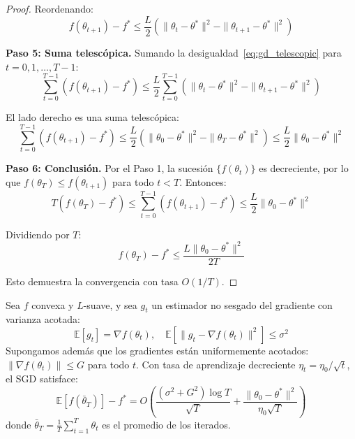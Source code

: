 \begin{proof}
	Reordenando:
	\begin{equation}\label{eq:gd_telescopic}
		f(\theta_{t+1}) - f^* \leq \frac{L}{2}\left(\|\theta_t - \theta^*\|^2 - \|\theta_{t+1} - \theta^*\|^2\right)
	\end{equation}

	\textbf{Paso 5: Suma telescópica.}
	Sumando la desigualdad~\eqref{eq:gd_telescopic} para \(t = 0, 1, \ldots, T-1\):
	\[
		\sum_{t=0}^{T-1} (f(\theta_{t+1}) - f^*) \leq \frac{L}{2} \sum_{t=0}^{T-1} \left(\|\theta_t - \theta^*\|^2 - \|\theta_{t+1} - \theta^*\|^2\right)
	\]

	El lado derecho es una suma telescópica:
	\[
		\sum_{t=0}^{T-1} (f(\theta_{t+1}) - f^*) \leq \frac{L}{2}\left(\|\theta_0 - \theta^*\|^2 - \|\theta_T - \theta^*\|^2\right) \leq \frac{L}{2}\|\theta_0 - \theta^*\|^2
	\]

	\textbf{Paso 6: Conclusión.}
	Por el Paso 1, la sucesión \(\{f(\theta_t)\}\) es decreciente, por lo que \(f(\theta_T) \leq f(\theta_{t+1})\) para todo \(t < T\). Entonces:
	\[
		T(f(\theta_T) - f^*) \leq \sum_{t=0}^{T-1} (f(\theta_{t+1}) - f^*) \leq \frac{L}{2}\|\theta_0 - \theta^*\|^2
	\]

	Dividiendo por \(T\):
	\[
		f(\theta_T) - f^* \leq \frac{L\|\theta_0 - \theta^*\|^2}{2T}
	\]

	Esto demuestra la convergencia con tasa \(O(1/T)\).
\end{proof}

\begin{theorem}\label{thm:sgd_convergence}
	Sea \(f\) convexa y \(L\)-suave, y sea \(g_t\) un estimador no sesgado del gradiente con varianza acotada:
	\[
		\mathbb{E}[g_t] = \nabla f(\theta_t), \quad \mathbb{E}[\|g_t - \nabla f(\theta_t)\|^2] \leq \sigma^2
	\]
	Supongamos además que los gradientes están uniformemente acotados: \(\|\nabla f(\theta_t)\| \leq G\) para todo \(t\). Con tasa de aprendizaje decreciente \(\eta_t = \eta_0/\sqrt{t}\), el SGD satisface:
	\[
		\mathbb{E}[f(\bar{\theta}_T)] - f^* = O\!\left(\frac{(\sigma^2 + G^2)\log T}{\sqrt{T}} + \frac{\|\theta_0 - \theta^*\|^2}{\eta_0\sqrt{T}}\right)
	\]
	donde \(\bar{\theta}_T = \frac{1}{T}\sum_{t=1}^T \theta_t\) es el promedio de los iterados.
\end{theorem}

